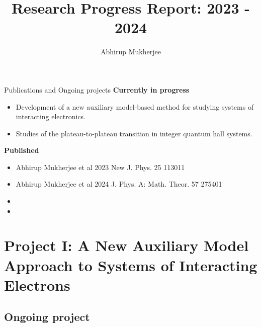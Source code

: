 \documentclass[12pt,aspectratio=169]{beamer}
\title{Research Progress Report: 2023 - 2024}
\author{Abhirup Mukherjee}
\institute{
Department of Physical Sciences,\\
IISER Kolkata, Mohanpur}
\newcommand\focus[1]{%
	{\alert{\textbf{#1}}}
}
\begin{document}
\centering

\begin{frame}
\maketitle
\end{frame}

\begin{frame}{Publications and Ongoing projects}
\focus{Currently in progress}
\begin{itemize}
	\item Development of a new auxiliary model-based method for studying systems of interacting electronics.\\[10pt]
	\item Studies of the plateau-to-plateau transition in integer quantum hall systems.
\end{itemize}

\vspace*{\fill}

\focus{Published}
\begin{itemize}
	\item Abhirup Mukherjee et al 2023 New J. Phys. 25 113011
	\item Abhirup Mukherjee et al 2024 J. Phys. A: Math. Theor. 57 275401\\[10pt]
	\item {}
	\item {}
\end{itemize}

\end{frame}

\section{Project I: A New Auxiliary Model Approach to Systems of Interacting Electrons}
\subsection{Ongoing project}
\end{document}
